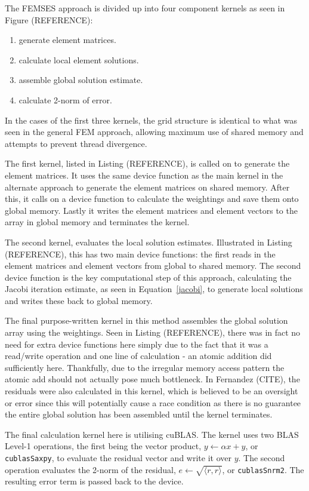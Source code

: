 The FEMSES approach is divided up into four component kernels as seen in Figure (REFERENCE):
\begin{enumerate}
	\item generate element matrices.
	\item calculate local element solutions.
	\item assemble global solution estimate.
	\item calculate 2-norm of error.
\end{enumerate}
In the cases of the first three kernels, the grid structure is identical to what was seen in the general FEM approach, allowing maximum use of shared memory and attempts to prevent thread divergence.

The first kernel, listed in Listing (REFERENCE), is called on to generate the element matrices. It uses the same device function as the main kernel in the alternate approach to generate the element matrices on shared memory. After this, it calls on a device function to calculate the weightings and save them onto global memory. Lastly it writes the element matrices and element vectors to the array in global memory and terminates the kernel.

The second kernel, evaluates the local solution estimates. Illustrated in Listing (REFERENCE), this has two main device functions: the first reads in the element matrices and element vectors from global to shared memory. The second device function is the key computational step of this approach, calculating the Jacobi iteration estimate, as seen in Equation~\eqref{jacobi}, to generate local solutions and writes these back to global memory.

The final purpose-written kernel in this method assembles the global solution array using the weightings. Seen in Listing (REFERENCE), there was in fact no need for extra device functions here simply due to the fact that it was a read/write operation and one line of calculation - an atomic addition did sufficiently here. Thankfully, due to the irregular memory access pattern the atomic add should not actually pose much bottleneck. In Fernandez (CITE), the residuals were also calculated in this kernel, which is believed to be an oversight or error since this will potentially cause a race  condition as there is no guarantee the entire global solution has been assembled until the kernel terminates.

The final calculation kernel here is utilising cuBLAS. The kernel uses two BLAS Level-1 operations, the first being the vector product, $y \leftarrow \alpha x + y$, or \texttt{cublasSaxpy}, to evaluate the residual vector and write it over $y$. The second operation evaluates the 2-norm of the residual, $e \leftarrow \sqrt{\langle r, r\rangle}$, or \texttt{cublasSnrm2}. The resulting error term is passed back to the device.

